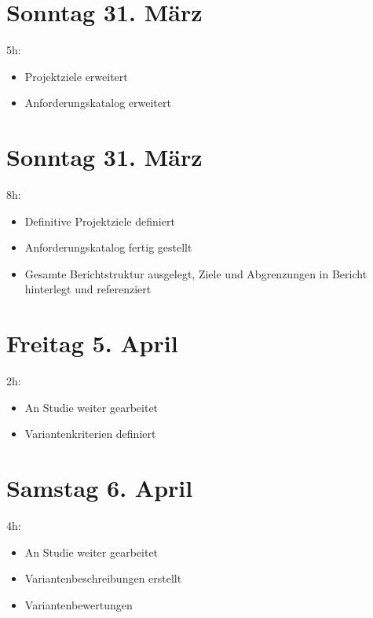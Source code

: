 \section{Sonntag 31. März}\label{sonntag-31.muxe4rz}

5h:

\begin{itemize}
  \tightlist
  \item
        Projektziele erweitert
  \item
        Anforderungskatalog erweitert
\end{itemize}

\section{Sonntag 31. März}\label{sonntag-31.muxe4rz}

8h:

\begin{itemize}
  \tightlist
  \item
        Definitive Projektziele definiert
  \item
        Anforderungskatalog fertig gestellt
  \item
        Gesamte Berichtstruktur ausgelegt, Ziele und Abgrenzungen in Bericht
        hinterlegt und referenziert
\end{itemize}

\section{Freitag 5. April}\label{freitag-5.april}

2h:

\begin{itemize}
  \tightlist
  \item
        An Studie weiter gearbeitet
  \item
        Variantenkriterien definiert
\end{itemize}

\section{Samstag 6. April}\label{samstag-6.april}

4h:

\begin{itemize}
  \tightlist
  \item
        An Studie weiter gearbeitet
  \item
        Variantenbeschreibungen erstellt
  \item
        Variantenbewertungen
\end{itemize}

